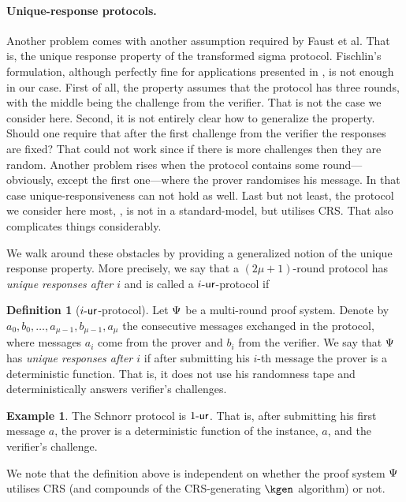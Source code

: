 \documentclass[runningheads,11pt]{llncs}
\theoremstyle{definition}
\newtheorem{definition}[theorem]{Definition}
\newtheorem{example}[theorem]{Example}
\begin{document}
\paragraph{Unique-response protocols.}
Another problem comes with another assumption required by Faust et al. That is, the unique response property of the transformed sigma protocol.
Fischlin's formulation, although perfectly fine for applications presented in \cite{C:Fischlin05}, is not enough in our case.
First of all, the property assumes that the protocol has three rounds, with the middle being the challenge from the verifier. That is not the case we consider here. Second, it is not entirely clear how to generalize the property. Should one require that after the first challenge from the verifier the responses are fixed? That could not work since if there is more challenges then they are random.
Another problem rises when the protocol contains some round---obviously, except the first one---where the prover randomises his message. In that case unique-responsiveness can not hold as well.
Last but not least, the protocol we consider here most, \plonk, is not in a standard-model, but utilises CRS. That also complicates things considerably.

We walk around these obstacles by providing a generalized notion of the unique response property.
More precisely, we say that a $(2\mu + 1)$-round protocol has \emph{unique responses after $i$} and is called a ${i\text{-}\mathsf{ur}}$-protocol if
\begin{definition}[${i\text{-}\mathsf{ur}}$-protocol]
	\label{def:wiur}
	Let $\mathrm{\Psi}$ be a multi-round proof system.
	Denote by $a_0, b_0, \ldots, a_{\mu - 1}, b_{\mu - 1}, a_{\mu}$ the consecutive messages exchanged in the protocol, where messages $a_i$ come from the prover and $b_i$ from the verifier.
	We say that $\mathrm{\Psi}$ has \emph{unique responses after $i$}
	if after submitting his $i$-th message the prover is a deterministic function. That is, it does not use his randomness tape and deterministically answers verifier's challenges.
\end{definition}
\begin{example}
	The Schnorr protocol is ${1\text{-}\mathsf{ur}}$. That is, after submitting his first message $a$, the prover is a deterministic function of the instance, $a$, and the verifier's challenge.
\end{example}

We note that the definition above is independent on whether the proof system $\mathrm{\Psi}$ utilises CRS (and compounds of the CRS-generating $\kgen$ algorithm) or not.
\end{document}
